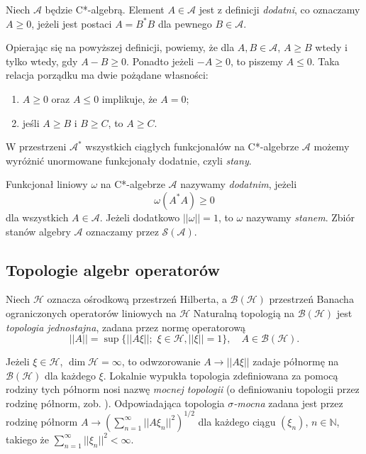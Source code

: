 \begin{Definition}
 Niech $\mathcal{A}$ będzie C*-algebrą. Element $A \in \mathcal{A}$ jest z
definicji \emph{dodatni}, co oznaczamy $A \geq 0$, jeżeli jest postaci
$A = B^{*}B$ dla pewnego $B \in \mathcal{A}$.
\end{Definition}

Opierając się na powyższej definicji, powiemy, że dla $A, B \in \mathcal{A}$,
$A \geq B$ wtedy i tylko wtedy, gdy $A-B \geq 0$. Ponadto jeżeli $-A
\geq 0$, to piszemy $A \leq 0$.
Taka relacja porządku ma dwie
pożądane własności:
\begin{enumerate}
 \item $A \geq 0$ oraz $A \leq 0$ implikuje, że $A =0$;
 \item jeśli $A \geq B$ i $B \geq C$, to $A \geq C$.
\end{enumerate}

W przestrzeni $\mathcal{A}^{*}$ wszystkich ciągłych funkcjonałów na
C*-algebrze $\mathcal{A}$ możemy wyróżnić unormowane funkcjonały dodatnie,
czyli \emph{stany}.

\begin{Definition}
 \label{def:stateOnCalg}
  Funkcjonał liniowy $\omega$ na C*-algebrze $\mathcal{A}$ nazywamy
\emph{dodatnim}, jeżeli
\begin{equation}
 \label{eq:stateOnCalg}
  \omega(A^{*}A) \geq 0
\end{equation}
dla wszystkich $A \in \mathcal{A}$.
Jeżeli dodatkowo $||\omega|| = 1$, to $\omega$ nazywamy \emph{stanem}.
Zbiór stanów algebry $\mathcal{A}$ oznaczamy przez $\mathcal{S}(\mathcal{A})$.
\end{Definition}

\subsection{Topologie algebr operatorów}
Niech $\mathcal{H}$ oznacza ośrodkową przestrzeń Hilberta, a $\mathcal{B}(\mathcal{H})$ przestrzeń
Banacha ograniczonych operatorów liniowych na $\mathcal{H}$
Naturalną topologią na $\mathcal{B}(\mathcal{H})$ jest \emph{topologia jednostajna}, zadana
przez normę operatorową
\begin{equation}
 \label{eq:operatorNorm}
  ||A|| = %
  \sup \{ ||A\xi||; \, \, \xi \in \mathcal{H}, %
	    ||\xi|| = 1 \}, \quad A \in \mathcal{B}(\mathcal{H}).
\end{equation}

Jeżeli $\xi \in \mathcal{H}$,
$\dim \mathcal{H} \!=\! \infty$, to odwzorowanie $A \rightarrow
||A\xi||$ zadaje
półnormę na $\mathcal{B}(\mathcal{H})$ dla każdego $\xi$.
Lokalnie wypukła topologia zdefiniowana za
pomocą rodziny tych półnorm nosi nazwę \emph{mocnej topologii}
(o definiowaniu
topologii przez rodzinę półnorm, zob. \cite{Rudin1991}).
Odpowiadająca topologia \emph{$\sigma$-mocna} zadana jest przez
rodzinę półnorm
$A \rightarrow \left( \sum \limits_{n=1}^{\infty} ||A \xi_{n}||^{2} \right)^{1/2}$
dla każdego ciągu $(\xi_{n})$,
$n \in \mathbb{N}$, takiego że
$\sum \limits_{n=1}^{\infty} ||\xi_{n}||^{2} < \infty$.

